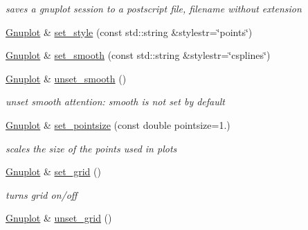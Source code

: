 \begin{DoxyCompactItemize}
\begin{DoxyCompactList}\small\item\em saves a gnuplot session to a postscript file, filename without extension \end{DoxyCompactList}\item 
\hyperlink{classGnuplot}{Gnuplot} \& \hyperlink{classGnuplot_acfdcda292650775ebed4683e8e1515b5}{set\+\_\+style} (const std\+::string \&stylestr=\char`\"{}points\char`\"{})
\item 
\hyperlink{classGnuplot}{Gnuplot} \& \hyperlink{classGnuplot_aa18386919da2ec4c994f1f9c7195d384}{set\+\_\+smooth} (const std\+::string \&stylestr=\char`\"{}csplines\char`\"{})
\item 
\hyperlink{classGnuplot}{Gnuplot} \& \hyperlink{classGnuplot_ad9dfbccd66dece1dbe5803605c6ab08c}{unset\+\_\+smooth} ()
\begin{DoxyCompactList}\small\item\em unset smooth attention\+: smooth is not set by default \end{DoxyCompactList}\item 
\hypertarget{classGnuplot_a95ec1636a871447dfe99463b769339c7}{\hyperlink{classGnuplot}{Gnuplot} \& \hyperlink{classGnuplot_a95ec1636a871447dfe99463b769339c7}{set\+\_\+pointsize} (const double pointsize=1.)}\label{classGnuplot_a95ec1636a871447dfe99463b769339c7}

\begin{DoxyCompactList}\small\item\em scales the size of the points used in plots \end{DoxyCompactList}\item 
\hypertarget{classGnuplot_a5416c8e81f1b9945b9631fa85a8d4f47}{\hyperlink{classGnuplot}{Gnuplot} \& \hyperlink{classGnuplot_a5416c8e81f1b9945b9631fa85a8d4f47}{set\+\_\+grid} ()}\label{classGnuplot_a5416c8e81f1b9945b9631fa85a8d4f47}

\begin{DoxyCompactList}\small\item\em turns grid on/off \end{DoxyCompactList}\item 
\hypertarget{classGnuplot_a53183e1487bc6977f0d46bf75d19b4d3}{\hyperlink{classGnuplot}{Gnuplot} \& \hyperlink{classGnuplot_a53183e1487bc6977f0d46bf75d19b4d3}{unset\+\_\+grid} ()}\label{classGnuplot_a53183e1487bc6977f0d46bf75d19b4d3}


\end{DoxyCompactItemize}
